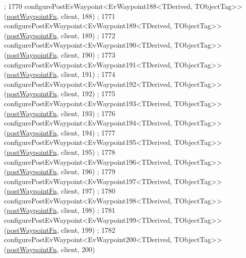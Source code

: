 \begin{DoxyCode}
      ;
1770     configurePostEvWaypoint<EvWaypoint188<TDerived, TObjectTag>>(\hyperlink{classcl__move__base__z_1_1WaypointEventDispatcher_a964a57fcce5d48ec60243230722d8dd7}{postWaypointFn}, client, 188)
      ;
1771     configurePostEvWaypoint<EvWaypoint189<TDerived, TObjectTag>>(\hyperlink{classcl__move__base__z_1_1WaypointEventDispatcher_a964a57fcce5d48ec60243230722d8dd7}{postWaypointFn}, client, 189)
      ;
1772     configurePostEvWaypoint<EvWaypoint190<TDerived, TObjectTag>>(\hyperlink{classcl__move__base__z_1_1WaypointEventDispatcher_a964a57fcce5d48ec60243230722d8dd7}{postWaypointFn}, client, 190)
      ;
1773     configurePostEvWaypoint<EvWaypoint191<TDerived, TObjectTag>>(\hyperlink{classcl__move__base__z_1_1WaypointEventDispatcher_a964a57fcce5d48ec60243230722d8dd7}{postWaypointFn}, client, 191)
      ;
1774     configurePostEvWaypoint<EvWaypoint192<TDerived, TObjectTag>>(\hyperlink{classcl__move__base__z_1_1WaypointEventDispatcher_a964a57fcce5d48ec60243230722d8dd7}{postWaypointFn}, client, 192)
      ;
1775     configurePostEvWaypoint<EvWaypoint193<TDerived, TObjectTag>>(\hyperlink{classcl__move__base__z_1_1WaypointEventDispatcher_a964a57fcce5d48ec60243230722d8dd7}{postWaypointFn}, client, 193)
      ;
1776     configurePostEvWaypoint<EvWaypoint194<TDerived, TObjectTag>>(\hyperlink{classcl__move__base__z_1_1WaypointEventDispatcher_a964a57fcce5d48ec60243230722d8dd7}{postWaypointFn}, client, 194)
      ;
1777     configurePostEvWaypoint<EvWaypoint195<TDerived, TObjectTag>>(\hyperlink{classcl__move__base__z_1_1WaypointEventDispatcher_a964a57fcce5d48ec60243230722d8dd7}{postWaypointFn}, client, 195)
      ;
1778     configurePostEvWaypoint<EvWaypoint196<TDerived, TObjectTag>>(\hyperlink{classcl__move__base__z_1_1WaypointEventDispatcher_a964a57fcce5d48ec60243230722d8dd7}{postWaypointFn}, client, 196)
      ;
1779     configurePostEvWaypoint<EvWaypoint197<TDerived, TObjectTag>>(\hyperlink{classcl__move__base__z_1_1WaypointEventDispatcher_a964a57fcce5d48ec60243230722d8dd7}{postWaypointFn}, client, 197)
      ;
1780     configurePostEvWaypoint<EvWaypoint198<TDerived, TObjectTag>>(\hyperlink{classcl__move__base__z_1_1WaypointEventDispatcher_a964a57fcce5d48ec60243230722d8dd7}{postWaypointFn}, client, 198)
      ;
1781     configurePostEvWaypoint<EvWaypoint199<TDerived, TObjectTag>>(\hyperlink{classcl__move__base__z_1_1WaypointEventDispatcher_a964a57fcce5d48ec60243230722d8dd7}{postWaypointFn}, client, 199)
      ;
1782     configurePostEvWaypoint<EvWaypoint200<TDerived, TObjectTag>>(\hyperlink{classcl__move__base__z_1_1WaypointEventDispatcher_a964a57fcce5d48ec60243230722d8dd7}{postWaypointFn}, client, 200)

\end{DoxyCode}
